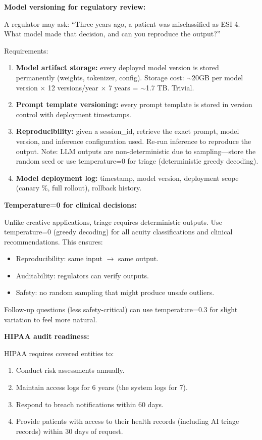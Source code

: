 \textbf{Model versioning for regulatory review:}

A regulator may ask: ``Three years ago, a patient was misclassified as ESI 4. What model made that decision, and can you reproduce the output?''

Requirements:
\begin{enumerate}
  \item \textbf{Model artifact storage:} every deployed model version is stored permanently (weights, tokenizer, config). Storage cost: $\sim$20GB per model version $\times$ 12 versions/year $\times$ 7 years = $\sim$1.7 TB. Trivial.
  \item \textbf{Prompt template versioning:} every prompt template is stored in version control with deployment timestamps.
  \item \textbf{Reproducibility:} given a session\_id, retrieve the exact prompt, model version, and inference configuration used. Re-run inference to reproduce the output. Note: LLM outputs are non-deterministic due to sampling---store the random seed or use temperature=0 for triage (deterministic greedy decoding).
  \item \textbf{Model deployment log:} timestamp, model version, deployment scope (canary \%, full rollout), rollback history.
\end{enumerate}

\textbf{Temperature=0 for clinical decisions:}

Unlike creative applications, triage requires deterministic outputs. Use temperature=0 (greedy decoding) for all acuity classifications and clinical recommendations. This ensures:
\begin{itemize}
  \item Reproducibility: same input $\rightarrow$ same output.
  \item Auditability: regulators can verify outputs.
  \item Safety: no random sampling that might produce unsafe outliers.
\end{itemize}

Follow-up questions (less safety-critical) can use temperature=0.3 for slight variation to feel more natural.

\textbf{HIPAA audit readiness:}

HIPAA requires covered entities to:
\begin{enumerate}
  \item Conduct risk assessments annually.
  \item Maintain access logs for 6 years (the system logs for 7).
  \item Respond to breach notifications within 60 days.
  \item Provide patients with access to their health records (including AI triage records) within 30 days of request.
\end{enumerate}

